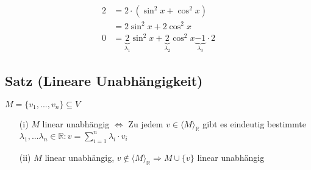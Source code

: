 \documentclass[a4paper, 12pt,titlepage, pdf, headsepline]{scrartcl}
\newcommand{\R}{\mathds{R}}
\newcommand{\vecspace}[2]{\langle#1\rangle_{#2}}
\newcommand{\vecspaceR}[1]{\vecspace{#1}{\R}}
\renewcommand{\>}{\rightarrow}
\renewcommand{\*}{\cdot}
\begin{document}
\begin{itemize}
\begin{itemize}
	      	      \begin{align*}
	      	      	2 & =2\*(\sin^2x+\cos^2x)                                                                              \\
	      	      	  & =2\sin^2x+2\cos^2x                                                                                 \\
	      	      	0 & =\underbrace{2}_{\lambda_1}\sin^2x+\underbrace{2}_{\lambda_2}\cos^2x\underbrace{-1}_{\lambda_3}\*2 
	      	      \end{align*}
	      \end{itemize}
\end{itemize}
\subsection{Satz (Lineare Unabhängigkeit)}
\label{1.16}
$M = \{v_1,...,v_n \} \subseteq V$\\
\begin{itemize}
	\item[(i)] $M$ linear unabhängig $\Leftrightarrow  \text{ Zu jedem } v \in \vecspaceR{M}$ gibt es eindeutig bestimmte \\
	      \noindent\hspace*{43mm}$\lambda_1, ... \lambda_n  \in \R:v = \sum_{i= 1}^{n} \lambda_i \cdot v_i$
	\item[(ii)] $M$ linear unabhängig, $v \notin \vecspaceR{M} \Rightarrow M \cup \{ v \} $ linear unabhängig 
\end{itemize}
\end{document}
